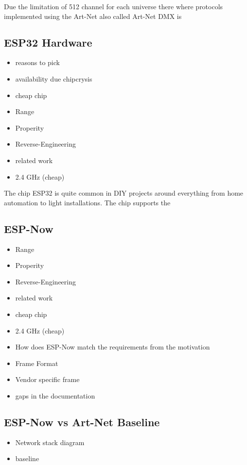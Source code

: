 \documentclass[]{ccs-thesis}
\begin{document}
Due the limitation of 512 channel for each universe there where protocols implemented using the 
Art-Net also called Art-Net DMX is 

\subsection{ESP32 Hardware}
\begin{itemize}
\item reasons to pick
\item availability due chipcrysis
\item cheap chip
\item Range
\item Properity
\item Reverse-Engineering 
\item related work
\item 2.4 GHz (cheap)
\end{itemize}
The chip ESP32 is quite common in DIY projects around everything from home automation to light installations. The chip supports the 

\subsection{ESP-Now}
\label{sub:ESP-Now}
\begin{itemize}
\item Range
\item Properity
\item Reverse-Engineering 
\item related work
\item cheap chip
\item 2.4 GHz (cheap)
\item How does ESP-Now match the requirements from the motivation
\item Frame Format
\item Vendor specific frame
\item gaps in the documentation
\end{itemize}

\subsection{ESP-Now vs Art-Net Baseline}
\begin{itemize}
\item Network stack diagram
\item baseline
\end{itemize}
\end{document}
